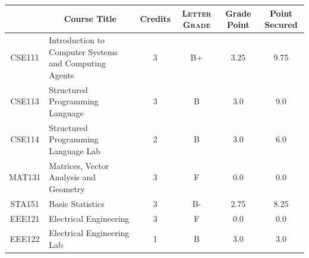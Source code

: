 \documentclass[11pt]{article}
\newcommand*{\numtwo}[1]{\pgfmathprintnumber[
                    fixed, precision=2, fixed zerofill=true]{#1}}
\begin{document}
                \begin{center}
                    \renewcommand{\arraystretch}{1.08}
                    
                \begin{tabular}{|c|l|c|>{\scshape}c|c|c|}
                \hline  \rule[-1ex]{0pt}{3.5ex} {\centering{\bf Course Code}} &  \multicolumn{1}{c|}{\textbf{Course Title}}  & {\bf Credits} & {\bf Letter Grade} & {\bf Grade Point} & {\bf Point Secured}  \\ 
                \hline   CSE111 &  Introduction to Computer Systems and Computing Agents		 & 3 & B+ & 3.25 & 9.75 \\ %
                \hline   CSE113 &  Structured Programming Language		 & 3 & B & 3.0 & 9.0 \\ %
                \hline   CSE114 &  Structured Programming Language Lab		 & 2 & B & 3.0 & 6.0 \\ %
                \hline   MAT131 &  Matrices, Vector Analysis and Geometry		 & 3 & F & 0.0 & 0.0 \\ %
                \hline   STA151 &  Basic Statistics		 & 3 & B- & 2.75 & 8.25 \\ %
                \hline   EEE121 &  Electrical Engineering		 & 3 & F & 0.0 & 0.0 \\ %
                \hline   EEE122 &  Electrical Engineering Lab		 & 1 & B & 3.0 & 3.0 \\ %

\hline                %
                \end{tabular}
                \end{center}
                \renewcommand{\arraystretch}{1.03}
\end{document}
